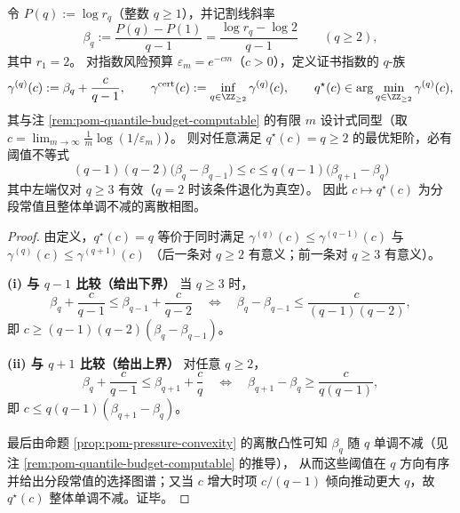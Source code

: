 \begin{proposition}\label{prop:pom-qstar-discrete-variational-threshold}
令 \(P(q):=\log r_q\)（整数 \(q\ge 1\)），并记割线斜率
\[
\beta_q:=\frac{P(q)-P(1)}{q-1}
=\frac{\log r_q-\log 2}{q-1}
\qquad(q\ge 2),
\]
其中 \(r_1=2\)。
对指数风险预算 \(\varepsilon_m=e^{-cm}\)（\(c>0\)），定义证书指数的 \(q\)-族
\[
\gamma^{(q)}(c):=\beta_q+\frac{c}{q-1},
\qquad
\gamma^{\mathrm{cert}}(c):=\inf_{q\in\ZZ_{\ge 2}}\gamma^{(q)}(c),
\qquad
q^\star(c)\in\arg\min_{q\in\ZZ_{\ge 2}}\gamma^{(q)}(c),
\]
其与注 \ref{rem:pom-quantile-budget-computable} 的有限 \(m\) 设计式同型（取 \(c=\lim_{m\to\infty}\frac1m\log(1/\varepsilon_m)\)）。
则对任意满足 \(q^\star(c)=q\ge 2\) 的最优矩阶，必有阈值不等式
\[
\boxed{\;
(q-1)(q-2)\bigl(\beta_q-\beta_{q-1}\bigr)\le c\le q(q-1)\bigl(\beta_{q+1}-\beta_{q}\bigr)\;}
\]
其中左端仅对 \(q\ge 3\) 有效（\(q=2\) 时该条件退化为真空）。
因此 \(c\mapsto q^\star(c)\) 为分段常值且整体单调不减的离散相图。
\end{proposition}
\begin{proof}
由定义，\(q^\star(c)=q\) 等价于同时满足
\(
\gamma^{(q)}(c)\le \gamma^{(q-1)}(c)
\)
与
\(
\gamma^{(q)}(c)\le \gamma^{(q+1)}(c)
\)
（后一条对 \(q\ge 2\) 有意义；前一条对 \(q\ge 3\) 有意义）。

\smallskip\noindent\textbf{(i) 与 \(q-1\) 比较（给出下界）}
当 \(q\ge 3\) 时，
\[
\beta_q+\frac{c}{q-1}\le \beta_{q-1}+\frac{c}{q-2}
\quad\Longleftrightarrow\quad
\beta_q-\beta_{q-1}\le \frac{c}{(q-1)(q-2)},
\]
即 \(c\ge (q-1)(q-2)(\beta_q-\beta_{q-1})\)。

\smallskip\noindent\textbf{(ii) 与 \(q+1\) 比较（给出上界）}
对任意 \(q\ge 2\)，
\[
\beta_q+\frac{c}{q-1}\le \beta_{q+1}+\frac{c}{q}
\quad\Longleftrightarrow\quad
\beta_{q+1}-\beta_q\ge \frac{c}{q(q-1)},
\]
即 \(c\le q(q-1)(\beta_{q+1}-\beta_q)\)。

\smallskip
最后由命题 \ref{prop:pom-pressure-convexity} 的离散凸性可知 \(\beta_q\) 随 \(q\) 单调不减（见注 \ref{rem:pom-quantile-budget-computable} 的推导），
从而这些阈值在 \(q\) 方向有序并给出分段常值的选择图谱；又当 \(c\) 增大时项 \(c/(q-1)\) 倾向推动更大 \(q\)，故 \(q^\star(c)\) 整体单调不减。证毕。
\end{proof}



\endinput

